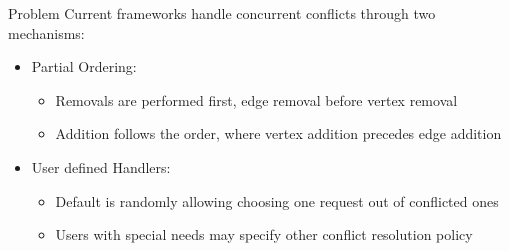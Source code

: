     \begin{frame}{Problem}
	Current frameworks handle concurrent conflicts through two mechanisms:          			\begin{itemize}
	            	\item Partial Ordering:
		    		\begin{itemize}
					\item Removals are performed first, edge removal before vertex removal
					\item Addition follows the order, where vertex addition precedes edge addition
				\end{itemize}
            \item User defined Handlers:
            		\begin{itemize}
					\item Default is randomly allowing choosing one request out of conflicted ones
					\item Users with special needs may specify other conflict resolution policy
         		 \end{itemize}
		 \end{itemize}
\end{frame}
